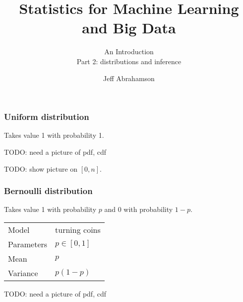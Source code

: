 \documentclass[t]{beamer}
\title
{Statistics for Machine Learning and Big Data}
\subtitle{An Introduction\\[6mm] Part 2: distributions and inference}
\author[Abrahamson] {Jeff Abrahamson}
\begin{document}
\begin{frame}
  \titlepage
\end{frame}


\begin{frame}
  \frametitle{Uniform distribution}

  Takes value 1 with probability 1.
  \bigskip
  
  
  TODO: need a picture of pdf, cdf
  
  
  TODO: show picture on $[0,n]$.

\end{frame}
\begin{frame}
  \frametitle{Bernoulli distribution}

  Takes value 1 with probability $p$ and 0 with probability $1-p$.
  \bigskip
  
  \begin{tabular}{ll}
    Model & turning coins\\[1mm]
    Parameters & $p\in [0,1]$\\[1mm]
    Mean & $p$\\[1mm]
    Variance & $p(1-p)$
  \end{tabular}

  TODO: need a picture of pdf, cdf
  
  \note{

  }
  
\end{frame}
\end{document}
